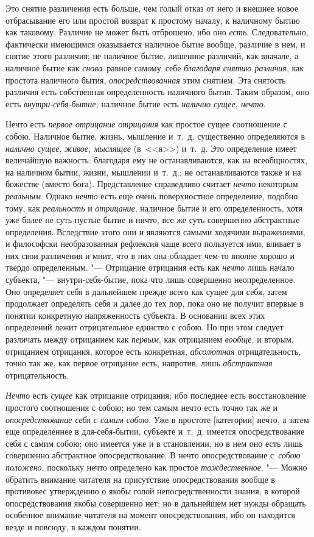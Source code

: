 Это снятие различения есть больше, чем голый отказ от него и внешнее новое
отбрасывание его или простой возврат к простому началу, к наличному бытию как
таковому. Различие не может быть отброшено, ибо оно {\em есть}. Следовательно,
фактически имеющимся оказывается наличное бытие вообще, различие в нем,
и снятие этого различия; не наличное бытие, лишенное различий, как вначале,
а наличное бытие как {\em снова}~равное самому~себе
{\em благодаря снятию различия}, как простота наличного бытия,
{\em опосредствованная} этим снятием. Эта снятость различия есть
собственная определенность наличного бытия. Таким образом, оно есть
{\em внутри-себя-бытие;} наличное бытие есть {\em налично сущее, нечто}.

Нечто есть {\em первое отрицание отрицания} как простое
сущее соотношение с собою. Наличное бытие, жизнь, мышление и~т.~д.
существенно определяются в {\em налично сущее},
{\em живое, мыслящее} (в~<<я>>)
и~т.~д. Это определение имеет величайшую важность: благодаря ему не
останавливаются, как на всеобщностях, на наличном бытии, жизни, мышлении
и~т.~д.; не останавливаются также и на божестве (вместо бога).
Представление справедливо считает {\em нечто} некоторым
{\em реальным}. Однако {\em нечто}
есть еще очень поверхностное определение, подобно тому, как
{\em реальность} и {\em отрицание},
наличное бытие и его определенность, хотя уже более не суть пустые бытие и
ничто, все же суть совершенно абстрактные определения. Вследствие этого они
и являются самыми ходячими выражениями, и философски необразованная
рефлексия чаще всего пользуется ими, вливает в них свои различения и мнит,
что в них она обладает чем-то вполне хорошо и твердо определенным. "---
Отрицание отрицания есть как {\em нечто} лишь начало
субъекта, "--- внутри-себя-бытие, пока что лишь совершенно неопределенное. Оно
определяет себя в дальнейшем прежде всего как сущее для себя, затем
продолжает определять себя и далее до тех пор, пока оно не получит впервые
в понятии конкретную напряженность субъекта. В основании всех этих
определений лежит отрицательное единство с собою. Но при этом следует
различать между отрицанием как {\em первым}, как
отрицанием {\em вообще}, и вторым, отрицанием
отрицания, которое есть конкретная, {\em абсолютная}
отрицательность, точно так же, как первое отрицание есть, напротив, лишь
{\em абстрактная} отрицательность.

{\em Нечто} есть {\em сущее} как отрицание отрицания; ибо последнее есть
восстановление простого соотношения с собою; но тем самым нечто есть точно так
же и {\em опосредствование себя с самим собою}. Уже в простоте [категории]
нечто, а затем еще определеннее в для-себя-бытии, субъекте и~т.~д. имеется
опосредствование себя с самим собою; оно имеется уже и в становлении, но в нем
оно есть лишь совершенно абстрактное опосредствование. В нечто опосредствование
с~{\em собою положено}, поскольку нечто определено как простое
{\em тождественное}. "--- Можно обратить внимание читателя на присутствие
опосредствования вообще в противовес утверждению о якобы голой
непосредственности знания, в которой опосредствования якобы совершенно нет; но
в дальнейшем нет нужды обращать особенное внимание читателя на момент
опосредствования, ибо он находится везде и повсюду, в каждом понятии.

